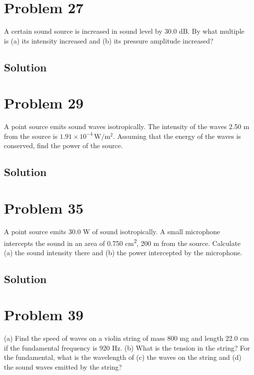 \documentclass[12pt]{article}
\newcommand{\E}[1]{\times 10^{#1}}
\begin{document}
    \pagebreak
    \section{Problem 27}
        A certain sound source is increased in sound level by 30.0 dB. By what multiple is (a) its intensity increased and (b) its pressure amplitude increased?

        \subsection{Solution}

    \pagebreak
    \section{Problem 29}
        A point source emits sound waves isotropically. 
        The intensity of the waves 2.50 m from the source is $1.91\E{-4}\,\unit{\watt/\meter^2}$. 
        Assuming that the energy of the waves is conserved, find the power of the source.

        \subsection{Solution}

    \pagebreak
    \section{Problem 35}
        A point source emits 30.0 W of sound isotropically. 
        A small microphone intercepts the sound in an area of 0.750 \unit{\centi\meter^2}, 200 m from the source. 
        Calculate (a) the sound intensity there and (b) the power intercepted by the microphone.

        \subsection{Solution}

    \pagebreak
    \section{Problem 39}
        (a) Find the speed of waves on a violin string of mass 800 mg and length 22.0 cm if the fundamental frequency is 920 Hz. 
        (b) What is the tension in the string? 
        For the fundamental, what is the wavelength of (c) the waves on the string and (d) the sound waves emitted by the string?
\end{document}

